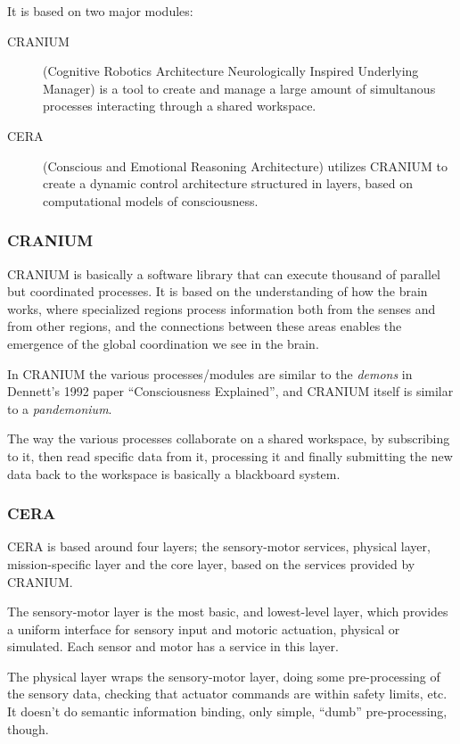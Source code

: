 It is based on two major modules:
\begin{description}
 \item [CRANIUM] (Cognitive Robotics Architecture Neurologically Inspired
Underlying Manager) is a tool to create and manage a large amount of
simultanous processes interacting through a shared workspace.
 \item [CERA] (Conscious and Emotional Reasoning Architecture)
 utilizes CRANIUM to create a dynamic control architecture structured in
layers, based on computational models of consciousness.
\end{description}

\subsubsection{CRANIUM}
CRANIUM is basically a software library that can execute thousand of parallel
but coordinated processes.
It is based on the understanding of how the brain works, where specialized
regions process information both from the senses and from other regions, and
the connections between these areas enables the emergence of the global
coordination we see in the brain.\cite{baars2005gwd}

In CRANIUM the various processes/modules are similar to the \textit{demons} in
Dennett's 1992 paper ``Consciousness Explained'', and CRANIUM itself is similar
to a \textit{pandemonium}\cite{dennet1992consciousness}.

The way the various processes collaborate on a shared workspace, by subscribing
to it, then read specific data from it, processing it and finally submitting the
new data back to the workspace is basically a blackboard
system.\cite{nii1986blackboard}

\subsubsection{CERA}
CERA is based around four layers; the sensory-motor services, physical layer,
mission-specific layer and the core layer, based on the services provided by
CRANIUM.

The sensory-motor layer is the most basic, and lowest-level layer, which
provides a uniform interface for sensory input and motoric actuation, physical
or simulated. Each sensor and motor has a service in this layer.

The physical layer wraps the sensory-motor layer, doing some pre-processing of
the sensory data, checking that actuator commands are within safety limits,
etc. It doesn't do semantic information binding, only simple, ``dumb''
pre-processing, though.

